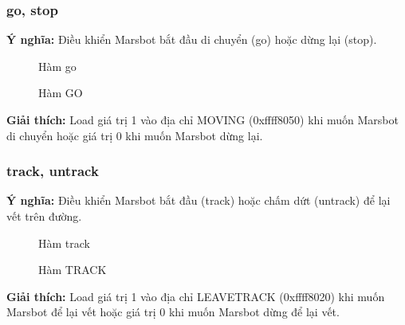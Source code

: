 \documentclass[a4paper,12pt]{article}
\begin{document}
	\subsubsection{go, stop}
	    \textbf{Ý nghĩa:} Điều khiển Marsbot bắt đầu di chuyển (go) hoặc dừng lại (stop).\\
        \FloatBarrier
        \begin{figure}[ht!]
    	    \centerline{}
    	    \caption{Hàm go}
    	    \label{fig:bai100}
        \end{figure}
        \begin{figure}[ht!]
    	    \centerline{}
    	    \caption{Hàm GO}
    	    \label{fig:bai100}
        \end{figure}
        \noindent
	    \textbf{Giải thích:} Load giá trị 1 vào địa chỉ MOVING (0xffff8050) khi muốn Marsbot di chuyển hoặc giá trị 0 khi muốn Marsbot dừng lại.
	    
	    \clearpage
    	\subsubsection{track, untrack}
	    \textbf{Ý nghĩa:} Điều khiển Marsbot bắt đầu (track) hoặc chấm dứt (untrack) để lại vết trên đường.\\
        \FloatBarrier
        \begin{figure}[ht!]
    	    \centerline{}
    	    \caption{Hàm track}
    	    \label{fig:bai100}
        \end{figure}
        \begin{figure}[ht!]
    	    \centerline{}
    	    \caption{Hàm TRACK}
    	    \label{fig:bai100}
        \end{figure}
        \noindent
	    \textbf{Giải thích:} Load giá trị 1 vào địa chỉ LEAVETRACK (0xffff8020) khi muốn Marsbot để lại vết hoặc giá trị 0 khi muốn Marsbot dừng để lại vết.
	   \clearpage
\end{document}
